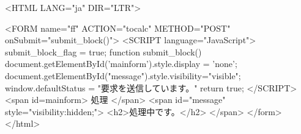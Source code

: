 <HTML LANG="ja" DIR="LTR">

<FORM name="ff" ACTION="tocalc" METHOD="POST" onSubmit="submit_block()">
<SCRIPT language="JavaScript">
submit_block_flag = true;
function submit_block(){
   document.getElementById('mainform').style.display = 'none';
   document.getElementById("message").style.visibility="visible";
   window.defaultStatus = "要求を送信しています。" 
   return true;
}
</SCRIPT>
<span id=mainform>
処理
</span>
<span id="message" style="visibility:hidden;">
<h2>処理中です。</h2>
</span>
</form>
</html>